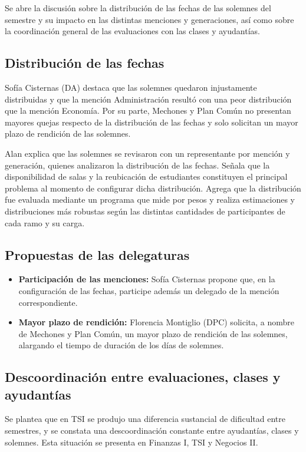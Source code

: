 \documentclass[12pt,letterpaper]{article}
\begin{document}
Se abre la discusión sobre la distribución de las fechas de las solemnes del semestre y su impacto en las distintas menciones y generaciones, así como sobre la coordinación general de las evaluaciones con las clases y ayudantías.

\subsection{Distribución de las fechas}

Sofía Cisternas (DA) destaca que las solemnes quedaron injustamente distribuidas y que la mención Administración resultó con una peor distribución que la mención Economía. Por su parte, Mechones y Plan Común no presentan mayores quejas respecto de la distribución de las fechas y solo solicitan un mayor plazo de rendición de las solemnes.

Alan explica que las solemnes se revisaron con un representante por mención y generación, quienes analizaron la distribución de las fechas. Señala que la disponibilidad de salas y la reubicación de estudiantes constituyen el principal problema al momento de configurar dicha distribución. Agrega que la distribución fue evaluada mediante un programa que mide por pesos y realiza estimaciones y distribuciones más robustas según las distintas cantidades de participantes de cada ramo y su carga.

\subsection{Propuestas de las delegaturas}

\begin{itemize}
  \item \textbf{Participación de las menciones:} Sofía Cisternas propone que, en la configuración de las fechas, participe además un delegado de la mención correspondiente.
  \item \textbf{Mayor plazo de rendición:} Florencia Montiglio (DPC) solicita, a nombre de Mechones y Plan Común, un mayor plazo de rendición de las solemnes, alargando el tiempo de duración de los días de solemnes.
\end{itemize}

\subsection{Descoordinación entre evaluaciones, clases y ayudantías}

Se plantea que en TSI se produjo una diferencia sustancial de dificultad entre semestres, y se constata una descoordinación constante entre ayudantías, clases y solemnes. Esta situación se presenta en Finanzas I, TSI y Negocios II.
\end{document}
